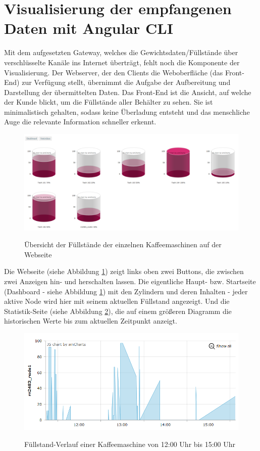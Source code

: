 \section{Visualisierung der empfangenen Daten mit Angular CLI}
Mit dem aufgesetzten Gateway, welches die Gewichtsdaten/Füllstände über verschlüsselte Kanäle ins Internet überträgt, fehlt noch die Komponente der Visualisierung. Der Webserver, der den Clients die Weboberfläche (das Front-End) zur Verfügung stellt, übernimmt die Aufgabe der Aufbereitung und Darstellung der übermittelten Daten.
Das Front-End ist die Ansicht, auf welche der Kunde blickt, um die Füllstände aller Behälter zu sehen. Sie ist minimalistisch gehalten, sodass keine Überladung entsteht und das menschliche Auge die relevante Information schneller erkennt. \\
\begin{figure}[H]
    \center
    \includegraphics[width=16cm]{Bilder/front-end-1.png}\\
    \caption{Übersicht der Füllstände der einzelnen Kaffeemaschinen auf der Webseite}
    \label{fig:front-end-1}
\end{figure}
\noindent
Die Webseite (siehe Abbildung \ref{fig:front-end-1}) zeigt links oben zwei Buttons, die zwischen zwei Anzeigen hin- und herschalten lassen. Die eigentliche Haupt- bzw. Startseite (Dashboard - siehe Abbildung \ref{fig:front-end-1}) mit den Zylindern und deren Inhalten
- jeder aktive Node wird hier mit seinem aktuellen Füllstand angezeigt. Und die Statistik-Seite (siehe Abbildung \ref{fig:front-end-2}), die auf einem größeren Diagramm die historischen Werte
bis zum aktuellen Zeitpunkt anzeigt.
\begin{figure}[H]
    \center
    \includegraphics[width=16cm]{Bilder/front-end-2.png}\\
    \caption{Füllstand-Verlauf einer Kaffeemaschine von 12:00 Uhr bis 15:00 Uhr}
    \label{fig:front-end-2}
\end{figure}
